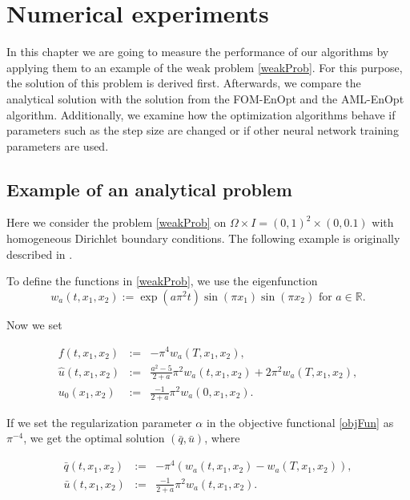 \chapter{Numerical experiments}

In this chapter we are going to measure the performance of our algorithms by applying them to an example of the weak problem \eqref{weakProb}. For this purpose, the solution of this problem is derived first. Afterwards, we compare the analytical solution with the solution from the FOM-EnOpt and the AML-EnOpt algorithm. Additionally, we examine how the optimization algorithms behave if parameters such as the step size are changed or if other neural network training parameters are used.

\section{Example of an analytical problem}

Here we consider the problem \eqref{weakProb} on $\Omega\times I=(0,1)^2\times(0,0.1)$ with homogeneous Dirichlet boundary conditions. The following example is originally described in \cite{doi:10.1137/070694016}.

To define the functions in \eqref{weakProb}, we use the eigenfunction
\begin{displaymath}
w_a(t,x_1,x_2):=\operatorname{exp}(a\pi^2t)\operatorname{sin}(\pi x_1)\operatorname{sin}(\pi x_2) \text{ for } a\in\mathbb{R}.
\end{displaymath}

Now we set

\begin{eqnarray*}
f(t,x_1,x_2)&:=&-\pi^4w_a(T,x_1,x_2),\\
\hat{u}(t,x_1,x_2)&:=&\frac{a^2-5}{2+a}\pi^2w_a(t,x_1,x_2)+2\pi^2w_a(T,x_1,x_2),\\
u_0(x_1,x_2)&:=&\frac{-1}{2+a}\pi^2w_a(0,x_1,x_2).
\end{eqnarray*}

If we set the regularization parameter $\alpha$ in the objective functional \eqref{objFun} as $\pi^{-4}$, we get the optimal solution $(\bar{q}, \bar{u})$, where

\begin{eqnarray*}
\bar{q}(t,x_1,x_2)&:=&-\pi^4\left(w_a(t,x_1,x_2)-w_a(T,x_1,x_2)\right),\\
\bar{u}(t,x_1,x_2)&:=&\frac{-1}{2+a}\pi^2w_a(t,x_1,x_2).%
\end{eqnarray*}


